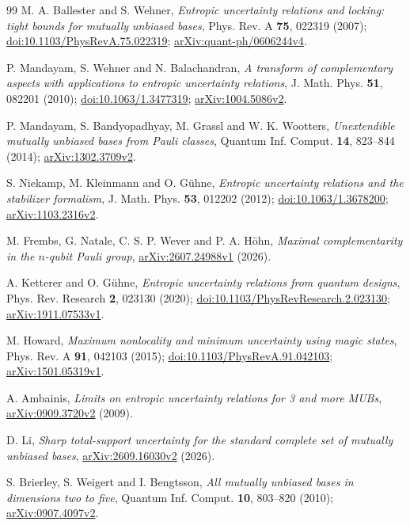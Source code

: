\documentclass[11pt,a4paper]{article}
\theoremstyle{plain}
\begin{document}
\begin{thebibliography}{99}
M. A. Ballester and S. Wehner,
\emph{Entropic uncertainty relations and locking: tight bounds for mutually unbiased bases},
Phys. Rev. A \textbf{75}, 022319 (2007);
\href{https://doi.org/10.1103/PhysRevA.75.022319}{doi:10.1103/PhysRevA.75.022319};
\href{https://arxiv.org/abs/quant-ph/0606244v4}{arXiv:quant-ph/0606244v4}.

P. Mandayam, S. Wehner and N. Balachandran,
\emph{A transform of complementary aspects with applications to entropic uncertainty relations},
J. Math. Phys. \textbf{51}, 082201 (2010);
\href{https://doi.org/10.1063/1.3477319}{doi:10.1063/1.3477319};
\href{https://arxiv.org/abs/1004.5086v2}{arXiv:1004.5086v2}.

P. Mandayam, S. Bandyopadhyay, M. Grassl and W. K. Wootters,
\emph{Unextendible mutually unbiased bases from Pauli classes},
Quantum Inf. Comput. \textbf{14}, 823--844 (2014);
\href{https://arxiv.org/abs/1302.3709v2}{arXiv:1302.3709v2}.

S. Niekamp, M. Kleinmann and O. G\"uhne,
\emph{Entropic uncertainty relations and the stabilizer formalism},
J. Math. Phys. \textbf{53}, 012202 (2012);
\href{https://doi.org/10.1063/1.3678200}{doi:10.1063/1.3678200};
\href{https://arxiv.org/abs/1103.2316v2}{arXiv:1103.2316v2}.

M. Frembs, G. Natale, C. S. P. Wever and P. A. H\"ohn,
\emph{Maximal complementarity in the $n$-qubit Pauli group},
\href{https://arxiv.org/abs/2607.24988v1}{arXiv:2607.24988v1} (2026).

A. Ketterer and O. G\"uhne,
\emph{Entropic uncertainty relations from quantum designs},
Phys. Rev. Research \textbf{2}, 023130 (2020);
\href{https://doi.org/10.1103/PhysRevResearch.2.023130}{doi:10.1103/PhysRevResearch.2.023130};
\href{https://arxiv.org/abs/1911.07533v1}{arXiv:1911.07533v1}.

M. Howard,
\emph{Maximum nonlocality and minimum uncertainty using magic states},
Phys. Rev. A \textbf{91}, 042103 (2015);
\href{https://doi.org/10.1103/PhysRevA.91.042103}{doi:10.1103/PhysRevA.91.042103};
\href{https://arxiv.org/abs/1501.05319v1}{arXiv:1501.05319v1}.

A. Ambainis,
\emph{Limits on entropic uncertainty relations for 3 and more MUBs},
\href{https://arxiv.org/abs/0909.3720v2}{arXiv:0909.3720v2} (2009).

D. Li,
\emph{Sharp total-support uncertainty for the standard complete set of mutually unbiased bases},
\href{https://arxiv.org/abs/2609.16030v2}{arXiv:2609.16030v2} (2026).

S. Brierley, S. Weigert and I. Bengtsson,
\emph{All mutually unbiased bases in dimensions two to five},
Quantum Inf. Comput. \textbf{10}, 803--820 (2010);
\href{https://arxiv.org/abs/0907.4097v2}{arXiv:0907.4097v2}.

\end{thebibliography}
\end{document}
